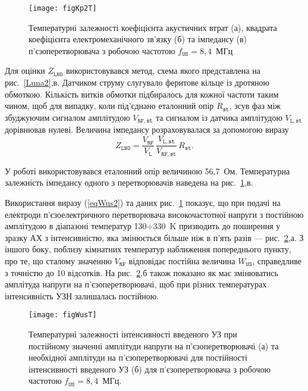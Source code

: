 \begin{figure}
\center
\texttt{[image: figKp2T]}%
\caption{\label{figKp2T}
Температурні залежності коефіцієнта акустичних втрат (а),
квадрата коефіцієнта електромеханічного зв'язку (б) та
імпедансу (в) п'єзоперетворювача з робочою частотою $f_\mathtt{US}=8,4$~МГц}
\end{figure}

Для оцінки $Z_\mathtt{LNO}$ використовувався метод,
схема якого представлена на рис.~\ref{Luna2},в.
Датчиком струму слугувало феритове кільце із дротяною обмоткою.
Кількість витків обмотки підбиралось для кожної частоти таким чином, щоб для випадку, коли під'єднано еталонний опір $R_\mathtt{st}$,
зсув фаз між збуджуючим сигналом амплітудою $V_\mathtt{RF,st}$ та сигналом із датчика амплітудою $V_\mathtt{L,st}$
дорівнював нулеві.
Величина імпедансу розраховувалася за допомогою виразу
 \begin{equation}
 \label{eqZlno}
 Z_\mathtt{LNO}=\frac{V_\mathtt{RF}}{V_\mathtt{L}}\,\frac{V_\mathtt{L,st}}{V_\mathtt{RF,st}}\,R_\mathtt{st}.
 \end{equation}

У роботі використовувався еталонний опір величиною 56,7~Ом.
Температурна залежність імпедансу одного з перетворювачів наведена на рис.~\ref{figKp2T},в.

Використання виразу (\ref{eqWus2}) та даних рис.~\ref{figKp2T} показує, що при подачі на електроди п'єзоелектричного перетворювача
високочастотної напруги з постійною амплітудою в діапазоні температур 130$\div$330~K призводить до поширення у зразку АХ з
інтенсивністю, яка змінюється більше ніж в п'ять разів --- рис.~\ref{figWusT},а.
З іншого боку, поблизу кімнатних температур наближення попереднього пункту, про те, що сталому значенню
$V_\mathtt{RF}$ відповідає постійна величина $ W_\mathtt{US}$, справедливе з точністю до 10 відсотків.
На рис.~\ref{figWusT},б також показано як має змінюватись амплітуда напруги на п'єзоперетворювачі, щоб при різних температурах
інтенсивність УЗН залишалась постійною.


\begin{figure}
\center
\texttt{[image: figWusT]}%
\caption{\label{figWusT}
Температурні залежності
інтенсивності введеного УЗ при постійному значенні амплітуди напруги на п'єзоперетворювачі (а)
та необхідної амплітуди на п'єзоперетворювачі для постійності інтенсивності введеного УЗ (б)
для п'єзоперетворювача з робочою частотою $f_\mathtt{US}=8,4$~МГц.
}
\end{figure}




